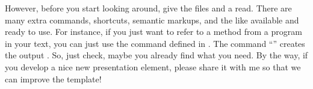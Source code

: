 However, before you start looking around, give the files  and  a read. There are many extra commands, shortcuts, semantic markups, and the like available and ready to use. For instance, if you just want to refer to a method from a program in your text, you can just use the command  defined in . The command ``'' creates the output . So, just check, maybe you already find what you need. By the way, if you develop a nice new presentation element, please share it with me so that we can improve the template!


